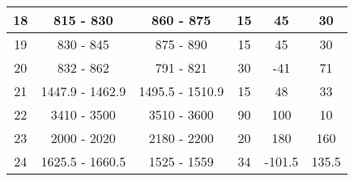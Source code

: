 \begin{table}[]
\begin{tabular}{|c|c|c|c|c|c|}
18                                                          & 815 - 830                                              & 860 - 875                                                & 15                                                                   & 45                                                               & 30                                                          \\ \hline
19                                                          & 830 - 845                                              & 875 - 890                                                & 15                                                                   & 45                                                               & 30                                                          \\ \hline
20                                                          & 832 - 862                                              & 791 - 821                                                & 30                                                                   & -41                                                              & 71                                                          \\ \hline
21                                                          & 1447.9 - 1462.9                                        & 1495.5 - 1510.9                                          & 15                                                                   & 48                                                               & 33                                                          \\ \hline
22                                                          & 3410 - 3500                                            & 3510 - 3600                                              & 90                                                                   & 100                                                              & 10                                                          \\ \hline
23                                                          & 2000 - 2020                                            & 2180 - 2200                                              & 20                                                                   & 180                                                              & 160                                                         \\ \hline
24                                                          & 1625.5 - 1660.5                                        & 1525 - 1559                                              & 34                                                                   & -101.5                                                           & 135.5                                                       \\ \hline

\end{tabular}
\end{table}
